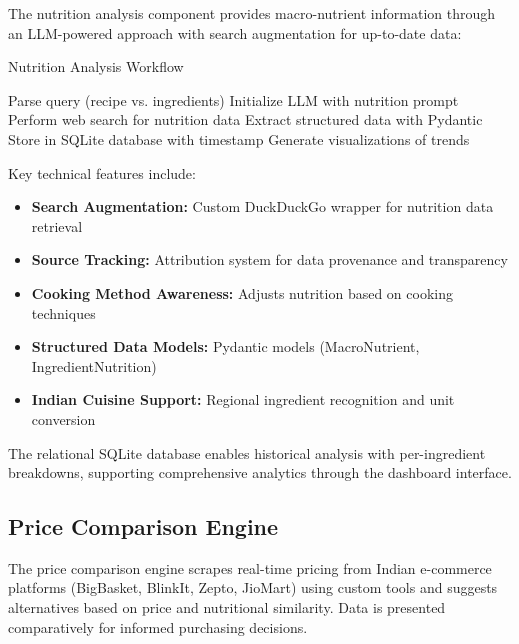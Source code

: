 \documentclass{ecai}
\begin{document}
The nutrition analysis component provides macro-nutrient information through an LLM-powered approach with search augmentation for up-to-date data:

\begin{algorithm}
\caption{Nutrition Analysis Workflow}
\begin{algorithmic}[1]
\State Parse query (recipe vs. ingredients)
\State Initialize LLM with nutrition prompt
\State Perform web search for nutrition data
\State Extract structured data with Pydantic
\State Store in SQLite database with timestamp
\State Generate visualizations of trends
\end{algorithmic}
\end{algorithm}

Key technical features include:

\begin{itemize}[noitemsep,topsep=0pt]
    \item \textbf{Search Augmentation:} Custom DuckDuckGo wrapper for nutrition data retrieval

    \item \textbf{Source Tracking:} Attribution system for data provenance and transparency

    \item \textbf{Cooking Method Awareness:} Adjusts nutrition based on cooking techniques

    \item \textbf{Structured Data Models:} Pydantic models (MacroNutrient, IngredientNutrition)

    \item \textbf{Indian Cuisine Support:} Regional ingredient recognition and unit conversion
\end{itemize}

The relational SQLite database enables historical analysis with per-ingredient breakdowns, supporting comprehensive analytics through the dashboard interface.

\subsection{Price Comparison Engine}

The price comparison engine scrapes real-time pricing from Indian e-commerce platforms (BigBasket, BlinkIt, Zepto, JioMart) using custom tools and suggests alternatives based on price and nutritional similarity. Data is presented comparatively for informed purchasing decisions.
\end{document}
